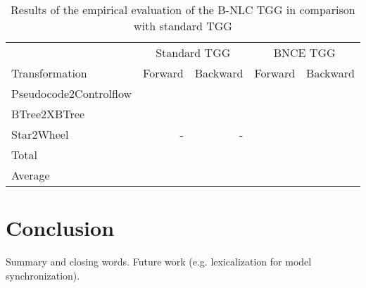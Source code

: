 \documentclass[]{report}
\begin{document}
\begin{table}[h]
	\centering
	\begin{tabular}{l r r r r }
			& \multicolumn{2}{c}{Standard TGG} & \multicolumn{2}{c}{BNCE TGG}\\
		Transformation 	& Forward & Backward & Forward & Backward \\
		\hline
		Pseudocode2Controlflow	& 		& 		& 	 	&  \\
		BTree2XBTree			&  		& 		& 		&  \\
		Star2Wheel				& -		& -		& 	 	&  \\
		\hline
		Total					&  & 		&	& \\
		Average					&  & 		&	& \\
	\end{tabular}
	\caption{Results of the empirical evaluation of the B-NLC TGG in comparison with standard TGG}
	\label{tab:evaluation}
\end{table}

\section{Conclusion}
Summary and closing words. Future work (e.g. lexicalization for model synchronization).




\end{document}
